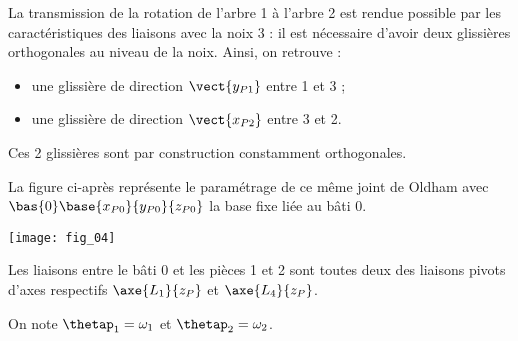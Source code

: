 La transmission de la rotation de l’arbre 1 à l’arbre 2 est rendue possible par les caractéristiques des liaisons avec la noix 3 : il est nécessaire d’avoir deux glissières orthogonales au niveau de la noix. Ainsi, on retrouve :
\begin{itemize}
\item une glissière de direction $\vect{y_{P1}}$ entre 1 et 3 ;
\item une glissière de direction $\vect{x_{P2}}$ entre 3 et 2.
\end{itemize}

Ces 2 glissières sont par construction constamment orthogonales.

La figure ci-après représente le paramétrage de ce même joint de Oldham avec $\bas{0}\base{x_{P0}}{y_{P0}}{z_{P0}}$ la base fixe liée au bâti 0.




\begin{center}%
\texttt{[image: fig\_04]}
\end{center}





Les liaisons entre le bâti 0 et les pièces 1 et 2 sont toutes deux des liaisons pivots d’axes respectifs
$\axe{L_1}{z_P}$ et $\axe{L_4}{z_P}$.




On note $\thetap_1 = \omega_1$ et $\thetap_2 = \omega_2$.

